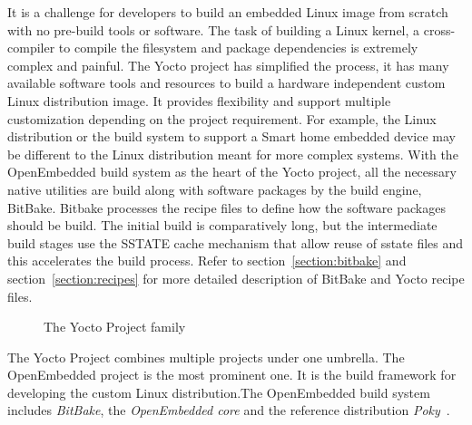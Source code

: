 It is a challenge for developers to build an embedded Linux image from scratch with no pre-build tools or software. The task of building a Linux kernel, a cross-compiler to compile the filesystem and package dependencies is extremely complex and painful. The Yocto project has simplified the process, it has many available software tools and resources to build a hardware independent custom Linux distribution image. It provides flexibility and support multiple customization depending on the project requirement. For example, the Linux distribution or the build system to support a Smart home embedded device may be different to the Linux distribution meant for more complex systems. With the OpenEmbedded build system as the heart of the Yocto project, all the necessary native utilities are build along with software packages by the build engine, BitBake. Bitbake processes the recipe files to define how the software packages should be build. The initial build is comparatively long, but the intermediate build stages use the \ac{SSTATE} cache mechanism that allow reuse of sstate files and this accelerates the build process. Refer to section~\ref{section:bitbake} and section~\ref{section:recipes} for more detailed description of BitBake and Yocto recipe files. 

\begin{figure}[H]
\caption[The Yocto Project family]{The Yocto Project family}
\label{fig:The Yocto Project family}
\end{figure}


The Yocto Project combines multiple projects under one umbrella. The OpenEmbedded project is the most prominent one. It is the build framework for developing the custom Linux distribution.The OpenEmbedded build system includes \emph{BitBake}, the \emph{OpenEmbedded core} and the reference distribution \emph{Poky}~\parencite{Reference1}.

